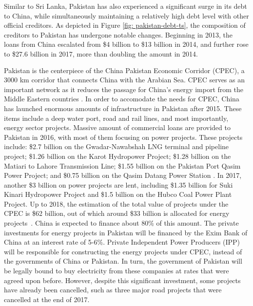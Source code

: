 Similar to Sri Lanka, Pakistan has also experienced a significant surge in its debt to China, while simultaneously maintaining a relatively high debt level with other official creditors. As depicted in Figure \ref{fig: pakistan-debt-ts}, the composition of creditors to Pakistan has undergone notable changes.  Beginning in 2013, the loans from China escalated from \$4 billion to \$13 billion in 2014, and further rose to \$27.6 billion in 2017, more than doubling the amount in 2014.

Pakistan is the centerpiece of the China Pakistan Economic Corridor (CPEC), a 3000 km corridor that connects China with the Arabian Sea.
CPEC serves as an important network as it reduces the passage for China's energy import from the Middle Eastern countries \citep*{CPEC-wiki}.
In order to accomodate the needs for CPEC, China has launched enormous amounts of infrastructure in Pakistan after 2015. These items include a deep water port, road and rail lines, and most importantly, energy sector projects.
Massive amount of commercial loans are provided to Pakistan in 2016, with most of them focusing on power projects.
These projects include:
\$2.7 billion on the Gwadar-Nawabshah LNG terminal and pipeline project;
\$1.26 billion on the Karot Hydropower Project;
\$1.28 billion on the Matiari to Lahore Transmission Line;
\$1.55 billion on the Pakistan Port Qasim Power Project; and \$0.75 billion on the Qasim Datang Power Station \citep*{Horn-Reinhart-Trebesch-21}.
In 2017, another \$3 billion on power projects are lent, including \$1.35 billion for Suki Kinari Hydropower Project and \$1.5 billion on the Hubco Coal Power Plant Project.
Up to 2018, the estimation of the total value of projects under the CPEC is \$62 billion, out of which around \$33 billion is allocated for energy projects~\citep*{Hurley19-8-debt-trap}. China is expected to finance about 80\% of this amount. The private investments for energy projects in Pakistan will be financed by the Exim Bank of China at an interest rate of 5-6\%.
Private Independent Power Producers (IPP) will be responsible for constructing the energy projects under CPEC, instead of the governments of China or Pakistan. In turn, the government of Pakistan will be legally bound to buy electricity from these companies at rates that were agreed upon before.
However, despite this significant investment, some projects have already been cancelled, such as three major road projects that were cancelled at the end of 2017\citep*{Hurley19-8-debt-trap}.

